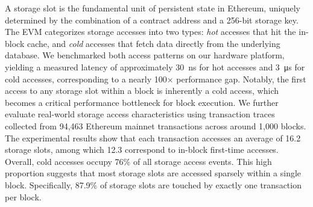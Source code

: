 \documentclass[conference]{IEEEtran}
\begin{document}

A storage slot is the fundamental unit of persistent state in Ethereum, uniquely determined by the combination of a contract address and a 256-bit storage key. The EVM categorizes storage accesses into two types: \emph{hot} accesses that hit the in-block cache, and \emph{cold} accesses that fetch data directly from the underlying database. We benchmarked both access patterns on our hardware platform, yielding a measured latency of approximately \qty{30}{\nano\second} for hot accesses and \qty{3}{\micro\second} for cold accesses, corresponding to a nearly 100$\times$ performance gap. Notably, the first access to any storage slot within a block is inherently a cold access, which becomes a critical performance bottleneck for block execution. We further evaluate real-world storage access characteristics using transaction traces collected from 94,463 Ethereum mainnet transactions across around 1,000 blocks. The experimental results show that each transaction accesses an average of 16.2 storage slots, among which 12.3 correspond to in-block first-time accesses. Overall, cold accesses occupy 76\% of all storage access events. This high proportion suggests that most storage slots are accessed sparsely within a single block. Specifically, 87.9\% of storage slots are touched by exactly one transaction per block.
\end{document}
